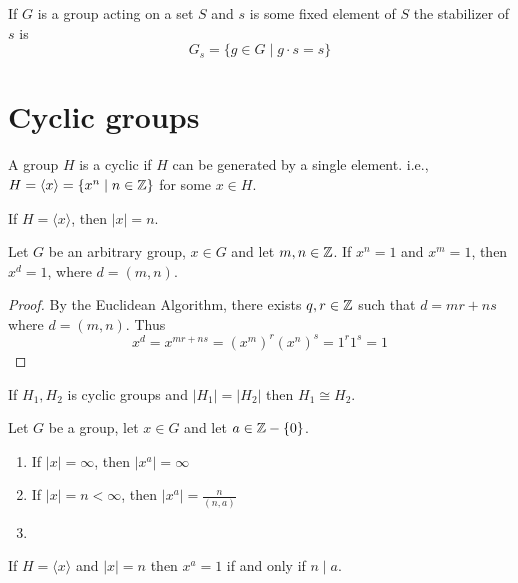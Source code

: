 \begin{definition}[Stabilizer]
  If $G$ is a group acting on a set $S$ and $s$ is some fixed element of $S$ 
  the stabilizer of $s$ is 
  $$G_s = \{g \in G \mid g\cdot s = s\}$$
\end{definition}

\section{Cyclic groups}

\begin{definition}
  A group $H$ is a cyclic if $H$ can be generated by a single element. i.e., $H = \langle x \rangle = \{x^n \mid n \in \mathbb Z\}$ for some $x \in H$.
\end{definition}

\begin{proposition}
  If $H = \langle x \rangle$, then $|x| = n$.
\end{proposition}

\begin{proposition}
  Let $G$ be an arbitrary group, $x \in G$ and let $m, n \in \mathbb Z$. If $x^n = 1$ and
$x^m = 1$, then $x^d = 1$, where $d = (m, n)$.  
\end{proposition}

\begin{proof}
  By the Euclidean Algorithm, there exists $q, r \in \mathbb Z$ such that $d = mr + ns$ where $d = (m, n)$. Thus
  $$x^d = x^{mr+ns} = (x^{m})^r(x^n)^s = 1^r1^s=1$$
\end{proof}

\begin{theorem}
  If $H_1, H_2$ is cyclic groups and $|H_1| = |H_2|$ then $H_1 \cong H_2$.
\end{theorem}

\begin{proposition}
  Let $G$ be a group, let $x \in G$ and let $a \in \mathbb Z - \{0\}$.
  \begin{enumerate}
    \item If $|x| = \infty$, then $|x^a| = \infty$
    \item If $|x| = n < \infty$, then $|x^a| = \frac{n}{(n, a)}$
    \item 
  \end{enumerate} 
\end{proposition}

\begin{theorem}
  If $H = \langle x \rangle$ and $|x| = n$ then $x^a = 1$ if and only if $n \mid a$.
\end{theorem}

